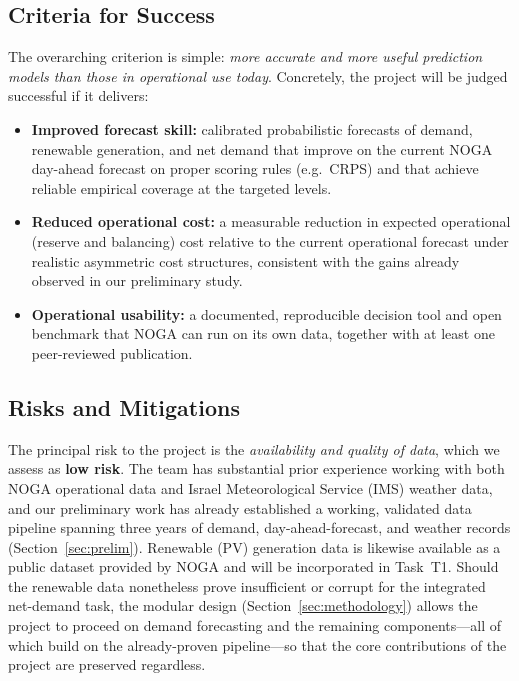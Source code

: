 \documentclass[12pt,a4paper]{article}
\begin{document}
\subsection{Criteria for Success}
The overarching criterion is simple: \emph{more accurate and more useful prediction models
than those in operational use today}. Concretely, the project will be judged successful if
it delivers:
\begin{itemize}[leftmargin=1.4em]
    \item \textbf{Improved forecast skill:} calibrated probabilistic forecasts of demand,
        renewable generation, and net demand that improve on the current NOGA day-ahead
        forecast on proper scoring rules (e.g.\ CRPS) and that achieve reliable empirical
        coverage at the targeted levels.
    \item \textbf{Reduced operational cost:} a measurable reduction in expected operational
        (reserve and balancing) cost relative to the current operational forecast under
        realistic asymmetric cost structures, consistent with the gains already observed in
        our preliminary study.
    \item \textbf{Operational usability:} a documented, reproducible decision tool and open
        benchmark that NOGA can run on its own data, together with at least one
        peer-reviewed publication.
\end{itemize}

\subsection{Risks and Mitigations}
The principal risk to the project is the \emph{availability and quality of data}, which we
assess as \textbf{low risk}. The team has substantial prior experience working with
both NOGA operational data and Israel Meteorological Service (IMS) weather data, and our
preliminary work has already established a working, validated data pipeline spanning three
years of demand, day-ahead-forecast, and weather records (Section~\ref{sec:prelim}).
Renewable (PV) generation data is likewise available as a public dataset provided by NOGA
and will be incorporated in Task~T1.
Should the renewable data nonetheless prove insufficient or corrupt for the integrated
net-demand task, the modular design (Section~\ref{sec:methodology}) allows the project
to proceed on demand forecasting and the remaining components---all of which build on the
already-proven pipeline---so that the core contributions of the project are preserved
regardless.
\end{document}
